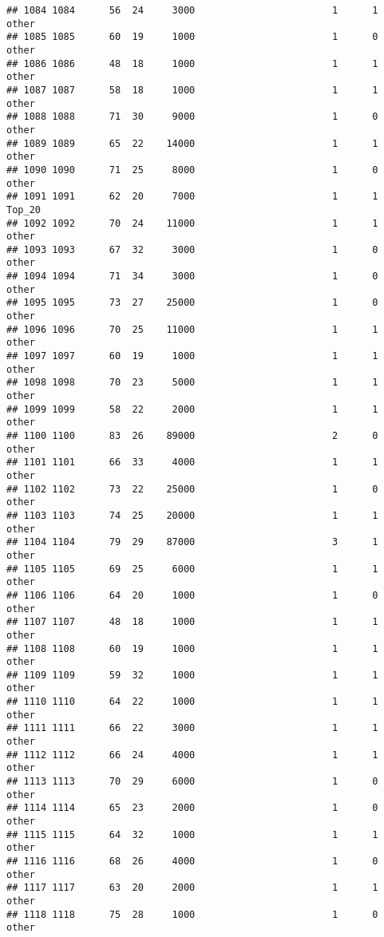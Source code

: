 \documentclass[
]{article}
\begin{document}
\begin{verbatim}
## 1084 1084      56  24     3000                        1      1    other
## 1085 1085      60  19     1000                        1      0    other
## 1086 1086      48  18     1000                        1      1    other
## 1087 1087      58  18     1000                        1      1    other
## 1088 1088      71  30     9000                        1      0    other
## 1089 1089      65  22    14000                        1      1    other
## 1090 1090      71  25     8000                        1      0    other
## 1091 1091      62  20     7000                        1      1   Top_20
## 1092 1092      70  24    11000                        1      1    other
## 1093 1093      67  32     3000                        1      0    other
## 1094 1094      71  34     3000                        1      0    other
## 1095 1095      73  27    25000                        1      0    other
## 1096 1096      70  25    11000                        1      1    other
## 1097 1097      60  19     1000                        1      1    other
## 1098 1098      70  23     5000                        1      1    other
## 1099 1099      58  22     2000                        1      1    other
## 1100 1100      83  26    89000                        2      0    other
## 1101 1101      66  33     4000                        1      1    other
## 1102 1102      73  22    25000                        1      0    other
## 1103 1103      74  25    20000                        1      1    other
## 1104 1104      79  29    87000                        3      1    other
## 1105 1105      69  25     6000                        1      1    other
## 1106 1106      64  20     1000                        1      0    other
## 1107 1107      48  18     1000                        1      1    other
## 1108 1108      60  19     1000                        1      1    other
## 1109 1109      59  32     1000                        1      1    other
## 1110 1110      64  22     1000                        1      1    other
## 1111 1111      66  22     3000                        1      1    other
## 1112 1112      66  24     4000                        1      1    other
## 1113 1113      70  29     6000                        1      0    other
## 1114 1114      65  23     2000                        1      0    other
## 1115 1115      64  32     1000                        1      1    other
## 1116 1116      68  26     4000                        1      0    other
## 1117 1117      63  20     2000                        1      1    other
## 1118 1118      75  28     1000                        1      0    other

\end{verbatim}
\end{document}
